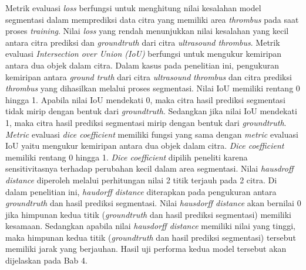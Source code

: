{Metrik evaluasi \textit{loss} berfungsi untuk menghitung nilai kesalahan model segmentasi dalam memprediksi data citra yang memiliki area \textit{thrombus} pada saat proses \textit{training}. Nilai \textit{loss} yang rendah menunjukkan nilai kesalahan yang kecil antara citra prediksi dan \textit{groundtruth} dari citra \textit{ultrasound thrombus}. Metrik evaluasi \textit{Intersection over Union (IoU)} berfungsi untuk mengukur kemiripan antara dua objek dalam citra. Dalam kasus pada penelitian ini, pengukuran kemiripan antara \textit{ground truth} dari citra \textit{ultrasound} \textit{thrombus} dan citra prediksi \textit{thrombus} yang dihasilkan melalui proses segmentasi. Nilai IoU memiliki rentang 0 hingga 1. Apabila nilai IoU mendekati 0, maka citra hasil prediksi segmentasi tidak mirip dengan bentuk dari \textit{groundtruth}. Sedangkan jika nilai IoU mendekati 1, maka citra hasil prediksi segmentasi mirip dengan bentuk dari \textit{groundtruth}. \textit{Metric} evaluasi \textit{dice coefficient} memiliki fungsi yang sama dengan \textit{metric} evaluasi IoU yaitu mengukur kemiripan antara dua objek dalam citra. \textit{Dice coefficient} memiliki rentang 0 hingga 1. \textit{Dice coefficient} dipilih peneliti karena sensitivitasnya terhadap perubahan kecil dalam area segmentasi. Nilai \textit{hausdroff distance} diperoleh melalui perhitungan nilai 2 titik terjauh pada 2 citra. Di dalam penelitian ini, \textit{haudorff distance} diterapkan pada pengukuran antara \textit{groundtruth} dan hasil prediksi segmentasi. Nilai \textit{hausdorff distance} akan bernilai 0 jika himpunan kedua titik (\textit{groundtruth} dan hasil prediksi segmentasi) memiliki kesamaan. Sedangkan apabila nilai \textit{hausdorff distance} memiliki nilai yang tinggi, maka himpunan kedua titik (\textit{groundtruth} dan hasil prediksi segmentasi) tersebut memiliki jarak yang berjauhan. Hasil uji performa kedua model tersebut akan dijelaskan pada Bab 4.


}
